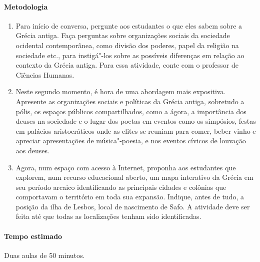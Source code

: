 \documentclass[12pt]{extarticle}
\begin{document}

\paragraph{Metodologia}

\begin{enumerate}

\item Para início de conversa, pergunte aos estudantes o que eles sabem sobre a Grécia
antiga. Faça perguntas sobre organizações sociais da sociedade ocidental 
contemporânea, como divisão dos poderes, papel da religião na sociedade etc.,
para instigá"-los sobre as possíveis diferenças em relação ao contexto da Grécia
antiga. Para essa atividade, conte com o professor de Ciências Humanas.

\item Neste segundo momento, é hora de uma abordagem mais expositiva. Apresente
as organizações sociais e políticas da Grécia antiga, sobretudo a pólis, os espaços
públicos compartilhados, como a ágora, a importância dos deuses na sociedade e 
o lugar dos poetas em eventos como os simpósios, festas em palácios aristocráticos
onde as elites se reuniam para comer, beber vinho e apreciar apresentações
de música"-poesia, e nos eventos cívicos de louvação aos deuses. 

\item Agora, num espaço com acesso à Internet, proponha aos estudantes que explorem, 
num recurso educacional aberto, um mapa interativo da Grécia em seu período 
arcaico identificando as principais cidades e colônias que comportavam o território
em toda sua expansão. Indique, antes de tudo, a posição da ilha de Lesbos, local de 
nascimento de Safo. A atividade deve ser feita até que todas as localizações
tenham sido identificadas.


\end{enumerate}


\paragraph{Tempo estimado} Duas aulas de 50 minutos.
\end{document}
